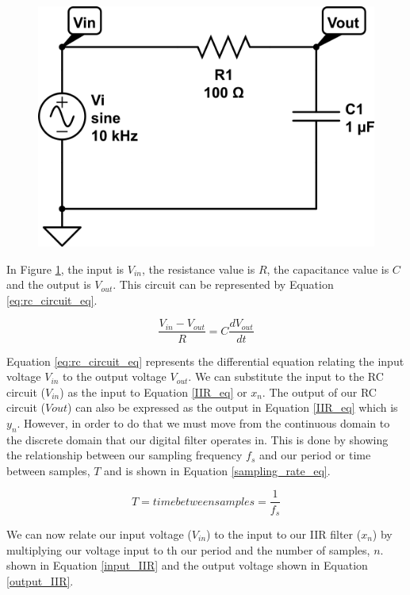 {\begin{figure}[h!tb] 
\centering
\includegraphics[width=14cm]{Images/rc-circuit.png}
\label{rc_circuit}
\end{figure}
}

In Figure \ref{rc_circuit}, the input is $V_{in}$, the resistance value is $R$, the capacitance value is $C$ and the output is $V_{out}$.  This circuit can be represented by Equation \ref{eq:rc_circuit_eq}.

\begin{equation}\label{eq:rc_circuit_eq}
\frac{V_{in}-V_{out}}{R}=C\frac{dV_{out}}{dt}
\end{equation}

Equation \ref{eq:rc_circuit_eq} represents the differential equation relating the input voltage $V_{in}$ to the output voltage $V_{out}$.  We can substitute the input to the RC circuit ($V_{in}$) as the input to Equation \ref{IIR_eq} or $x_n$.  The output of our RC circuit ($V{out}$) can also be expressed as the output in Equation \ref{IIR_eq} which is $y_n$.  However, in order to do that we must move from the continuous domain to the discrete domain that our digital filter operates in.  This is done by showing the relationship between our sampling frequency $f_s$ and our period or time between samples, $T$ and is shown in Equation \ref{sampling_rate_eq}.

\begin{equation}\label{sampling_rate_eq}
T=time between samples=\frac{1}{f_s}
\end{equation}

We can now relate our input voltage ($V_{in}$) to the input to our IIR filter ($x_n$) by multiplying our voltage input to th our period and the number of samples, $n$. shown in Equation \ref{input_IIR} and the output voltage shown in Equation \ref{output_IIR}.

